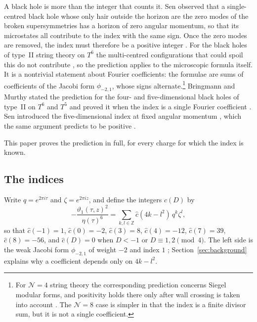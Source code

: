 \documentclass[11pt]{amsart}
\theoremstyle{definition}
\newcommand{\ZZ}{\mathbb{Z}}
\newcommand{\cc}{\hat c}
\newcommand{\vt}{\vartheta}
\begin{document}
A black hole is more than the integer that counts it. Sen observed that a single-centred black hole whose only hair outside the horizon are the zero modes of the broken supersymmetries has a horizon of zero angular momentum, so that its microstates all contribute to the index with the same sign. Once the zero modes are removed, the index must therefore be a positive integer \cite{Sen11,DGMS11,CGMS16}. For the black holes of type~II string theory on $T^6$ the multi-centred configurations that could spoil this do not contribute \cite{Sen08b,Sen10}, so the prediction applies to the microscopic formula itself. It is a nontrivial statement about Fourier coefficients: the formulae are sums of coefficients of the Jacobi form $\phi_{-2,1}$, whose signs alternate.\footnote{For $\mathcal N=4$ string theory the corresponding prediction concerns Siegel modular forms, and positivity holds there only after wall crossing is taken into account \cite{Sen11}. The $\mathcal N=8$ case is simpler in that the index is a finite divisor sum, but it is not a single coefficient.} Bringmann and Murthy stated the prediction for the four- and five-dimensional black holes of type~II on $T^6$ and $T^5$ and proved it when the index is a single Fourier coefficient \cite{BM13}. Sen introduced the five-dimensional index at fixed angular momentum \cite{Sen12}, which the same argument predicts to be positive \cite{BM13}.

This paper proves the prediction in full, for every charge for which the index is known.

\subsection*{The indices}
Write $q=e^{2\pi i\tau}$ and $\zeta=e^{2\pi iz}$, and define the integers $\cc(D)$ by
\begin{equation}\label{eq:phi}
-\frac{\vt_1(\tau,z)^2}{\eta(\tau)^6}=\sum_{k,l\in\ZZ}\cc(4k-l^2)\,q^k\zeta^l ,
\end{equation}
so that $\cc(-1)=1$, $\cc(0)=-2$, $\cc(3)=8$, $\cc(4)=-12$, $\cc(7)=39$, $\cc(8)=-56$, and $\cc(D)=0$ when $D<-1$ or $D\equiv1,2\pmod 4$. The left side is the weak Jacobi form $\phi_{-2,1}$ of weight $-2$ and index $1$ \cite[\S9]{EZ85}; Section~\ref{sec:background} explains why a coefficient depends only on $4k-l^2$.
\end{document}

